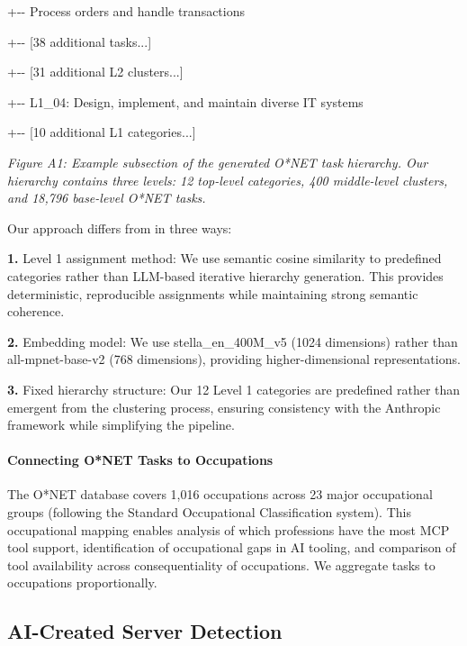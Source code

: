 \documentclass[manuscript,screen,nonacm,oneside]{acmart}
\begin{document}
\textbar{} \textbar{} +-\/- Process orders and handle transactions

\textbar{} \textbar{} +-\/- {[}38 additional tasks...{]}

\textbar{} +-\/- {[}31 additional L2 clusters...{]}

+-\/- L1\_04: Design, implement, and maintain diverse IT systems

+-\/- {[}10 additional L1 categories...{]}

\emph{Figure A1: Example subsection of the generated O*NET task hierarchy. Our hierarchy contains three levels: 12 top-level categories, 400 middle-level clusters, and 18,796 base-level O*NET tasks.}

Our approach differs from \citet{handa2025which} in three ways:

\textbf{1.} Level 1 assignment method: We use semantic cosine similarity to predefined categories rather than LLM-based iterative hierarchy generation. This provides deterministic, reproducible assignments while maintaining strong semantic coherence.

\textbf{2.} Embedding model: We use stella\_en\_400M\_v5 (1024 dimensions) rather than all-mpnet-base-v2 (768 dimensions), providing higher-dimensional representations.

\textbf{3.} Fixed hierarchy structure: Our 12 Level 1 categories are predefined rather than emergent from the clustering process, ensuring consistency with the Anthropic framework while simplifying the pipeline.

\paragraph{Connecting O*NET Tasks to Occupations}\label{connecting-onet-tasks-to-occupations}

The O*NET database covers 1,016 occupations across 23 major occupational groups (following the Standard Occupational Classification system). This occupational mapping enables analysis of which professions have the most MCP tool support, identification of occupational gaps in AI tooling, and comparison of tool availability across consequentiality of occupations. We aggregate tasks to occupations proportionally.

\subsection{AI-Created Server Detection}
\label{app:ai-detection}
\end{document}
